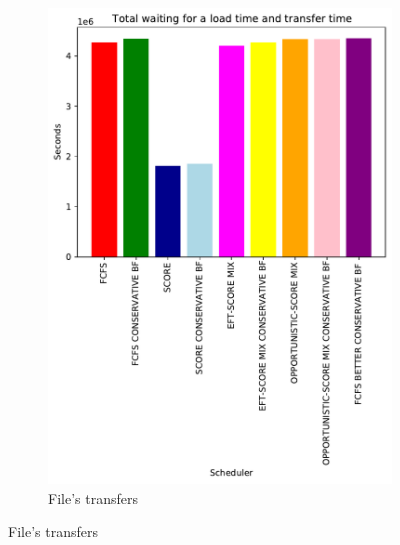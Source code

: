 \documentclass[a4paper]{article}
\begin{document}
\begin{figure}[H]\centering
\begin{subfigure}[b]{0.4\linewidth}\centering\includegraphics[width=0.9\linewidth]{MBSS/plot/Results_FCFS_Score_Backfill_2022-01-17->2022-01-17_V9271_Total_waiting_for_a_load_time_and_transfer_time_450_128_32_256_4_1024.pdf}\caption{File's transfers}\end{subfigure}

\end{figure}
\end{document}

